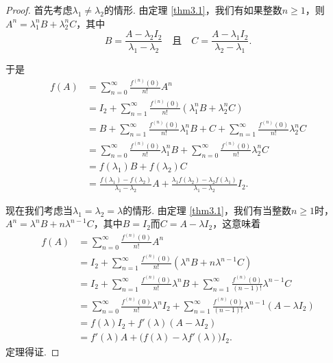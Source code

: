 \begin{proof}
  首先考虑$\lambda_1\ne\lambda_2$的情形. 由定理 \ref{thm3.1}，我们有如果整数$n\ge1$，则$A^n=\lambda_1^nB+\lambda_2^nC$，其中
  \[
    B = \frac{A-\lambda_2I_2}{\lambda_1-\lambda_2}\quad
    \text{且}\quad C = \frac{A-\lambda_1I_2}{\lambda_2-\lambda_1}.
  \]

  于是
  \begin{align*}
    f(A) & = \sum_{n=0}^\infty \frac{f^{(n)}(0)}{n!}A^n \\
    & = I_2 + \sum_{n=1}^\infty \frac{f^{(n)}(0)}{n!} (\lambda_1^nB + \lambda_2^n C) \\
    & = B + \sum_{n=1}^\infty \frac{f^{(n)}(0)}{n!} \lambda_1^nB + C +
    \sum_{n=1}^\infty \frac{f^{(n)}(0)}{n!}\lambda_2^nC \\
    & = \sum_{n=0}^\infty \frac{f^{(n)}(0)}{n!}\lambda_1^nB +
    \sum_{n=0}^\infty \frac{f^{(n)}(0)}{n!}\lambda_2^nC \\
    & = f(\lambda_1)B + f(\lambda_2)C \\
    & = \frac{f(\lambda_1) - f(\lambda_2)}{\lambda_1 - \lambda_2} A + \frac{\lambda_1f(\lambda_2) - \lambda_2f(\lambda_1)}{\lambda_1 - \lambda_2}I_2.
  \end{align*}

  现在我们考虑当$\lambda_1=\lambda_2=\lambda$的情形. 由定理 \ref{thm3.1}，我们有当整数$n\ge1$时，$A^n=\lambda^nB+n\lambda^{n-1}C$，其中$B=I_2$而$C=A-\lambda I_2$，这意味着
  \begin{align*}
    f(A) & = \sum_{n=0}^\infty \frac{f^{(n)}(0)}{n!}A^n \\
    & = I_2 + \sum_{n=1}^\infty \frac{f^{(n)}(0)}{n!} (\lambda^nB + n\lambda^{n-1} C) \\
    & = I_2 + \sum_{n=1}^\infty \frac{f^{(n)}(0)}{n!}\lambda^nB + \sum_{n=1}^\infty \frac{f^{(n)}(0)}{(n-1)!}\lambda^{n-1}C \\
    & = \sum_{n=0}^\infty \frac{f^{(n)}(0)}{n!}\lambda^n I_2 + \sum_{n=1}^\infty \frac{f^{(n)}(0)}{(n-1)!}
    \lambda^{n-1}(A - \lambda I_2) \\
    & = f(\lambda)I_2 + f'(\lambda)(A - \lambda I_2) \\
    & = f'(\lambda) A + \big( f(\lambda) - \lambda f'(\lambda) \big)I_2.
  \end{align*}
  定理得证.
\end{proof}

